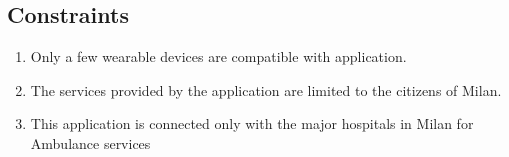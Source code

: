 \subsection{Constraints}
\begin{enumerate}
\item Only a few wearable devices are compatible with application.
\item The services provided by the application are limited to the citizens of Milan.
\item This application is connected only with the major hospitals in Milan for Ambulance services
\end{enumerate}